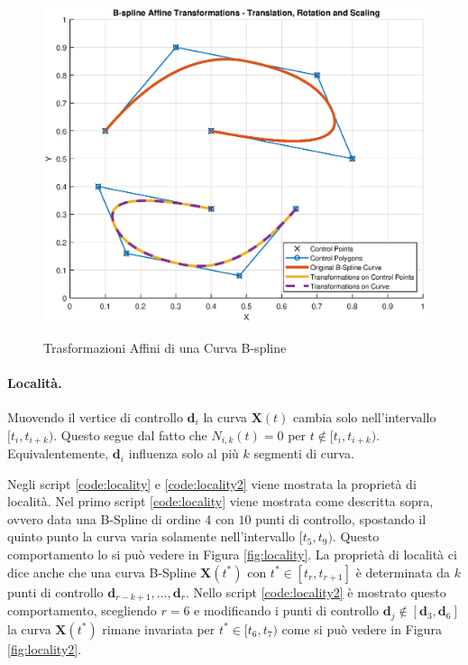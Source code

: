 \documentclass[a4paper, 12pt]{article}
\begin{document}
\begin{figure}[h]
	\centering
	\caption{Trasformazioni Affini di una Curva B-spline}
	\includegraphics[scale=0.7]{curve_affine_trans_plot.eps}
	\label{fig:transAffCurve}
\end{figure}


\paragraph{Località.}
Muovendo il vertice di controllo $\mathbf{d}_i$ la curva $\mathbf{X}(t)$ cambia solo nell’intervallo $[t_i, t_{i+k})$. Questo segue dal fatto che $N_{i, k}(t) = 0$ per $t \notin [t_i, t_{i+k})$. Equivalentemente, $\mathbf{d}_i$ influenza solo al più $k$ segmenti di curva.

Negli script \ref{code:locality} e \ref{code:locality2} viene mostrata la proprietà di località. Nel primo script \ref{code:locality} viene mostrata come descritta sopra, ovvero data una B-Spline di ordine 4 con $10$ punti di controllo, spostando il quinto punto la curva  varia solamente nell'intervallo $[t_5,t_9)$. Questo comportamento lo si può vedere in Figura \ref{fig:locality}. La proprietà di località ci dice anche che una curva B-Spline $\mathbf{X}(t^*)$ con $t^* \in [t_r,t_{r+1}]$ è determinata da $k$ punti di controllo $\mathbf{d}_{r-k+1},\dots,\mathbf{d}_r$. Nello script \ref{code:locality2} è mostrato questo comportamento, scegliendo $r=6$ e modificando i punti di controllo $\mathbf{d}_j \notin [\mathbf{d}_3, \mathbf{d}_6]$ la curva $\mathbf{X}(t^*)$ rimane invariata per $t^* \in [t_6,t_7)$ come si può vedere in Figura \ref{fig:locality2}. \newpage
\end{document}
